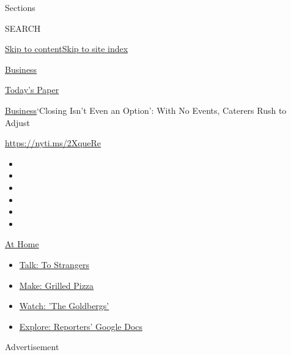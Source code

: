 Sections

SEARCH

\protect\hyperlink{site-content}{Skip to
content}\protect\hyperlink{site-index}{Skip to site index}

\href{https://www.nytimes.com/section/business}{Business}

\href{https://myaccount.nytimes.com/auth/login?response_type=cookie\&client_id=vi}{}

\href{https://www.nytimes.com/section/todayspaper}{Today's Paper}

\href{/section/business}{Business}\textbar{}`Closing Isn't Even an
Option': With No Events, Caterers Rush to Adjust

\url{https://nyti.ms/2XqueRe}

\begin{itemize}
\item
\item
\item
\item
\item
\item
\end{itemize}

\href{https://www.nytimes.com/spotlight/at-home?action=click\&pgtype=Article\&state=default\&region=TOP_BANNER\&context=at_home_menu}{At
Home}

\begin{itemize}
\tightlist
\item
  \href{https://www.nytimes.com/2020/08/03/well/family/the-benefits-of-talking-to-strangers.html?action=click\&pgtype=Article\&state=default\&region=TOP_BANNER\&context=at_home_menu}{Talk:
  To Strangers}
\item
  \href{https://www.nytimes.com/2020/08/01/at-home/coronavirus-make-pizza-on-a-grill.html?action=click\&pgtype=Article\&state=default\&region=TOP_BANNER\&context=at_home_menu}{Make:
  Grilled Pizza}
\item
  \href{https://www.nytimes.com/2020/07/31/arts/television/goldbergs-abc-stream.html?action=click\&pgtype=Article\&state=default\&region=TOP_BANNER\&context=at_home_menu}{Watch:
  'The Goldbergs'}
\item
  \href{https://www.nytimes.com/interactive/2020/at-home/even-more-reporters-editors-diaries-lists-recommendations.html?action=click\&pgtype=Article\&state=default\&region=TOP_BANNER\&context=at_home_menu}{Explore:
  Reporters' Google Docs}
\end{itemize}

Advertisement

